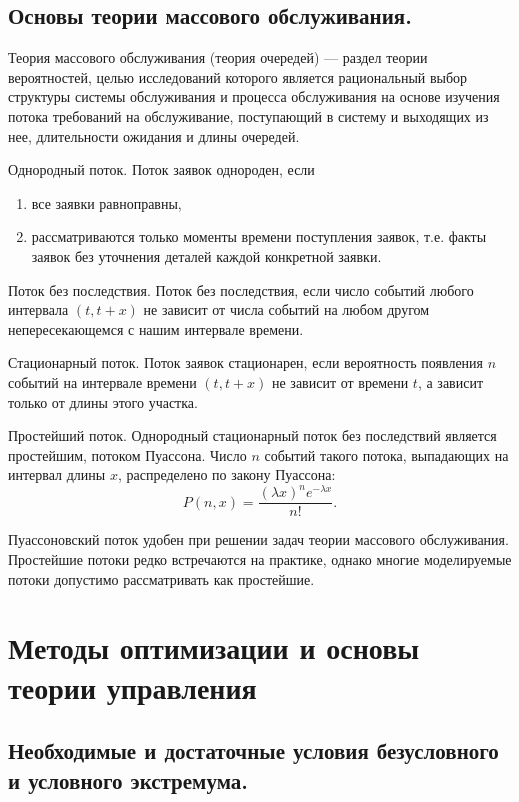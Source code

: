 \documentclass[12pt]{report}
\theoremstyle{definition}
\begin{document}

\section
{
  Основы теории массового обслуживания.
}

Теория массового обслуживания (теория очередей) --- раздел теории вероятностей,
целью исследований которого является рациональный выбор структуры системы обслуживания
и процесса обслуживания на основе изучения потока требований на обслуживание, поступающий
в систему и выходящих из нее, длительности ожидания и длины очередей.

Однородный поток. Поток заявок однороден, если
\begin{enumerate}
\item все заявки равноправны,
\item рассматриваются только моменты времени поступления заявок, т.е. факты
заявок без уточнения деталей каждой конкретной заявки.
\end{enumerate}


Поток без последствия. Поток без последствия, если число событий любого интервала
$(t, t + x)$ не зависит от числа событий на любом другом непересекающемся с нашим
интервале времени.


Стационарный поток. Поток заявок стационарен, если вероятность появления $n$
событий на интервале времени $(t, t + x)$ не зависит от времени $t$, а зависит
только от длины этого участка.


Простейший поток. Однородный стационарный поток без последствий является
простейшим, потоком Пуассона.
Число $n$ событий такого потока, выпадающих на интервал длины $x$, распределено
по закону Пуассона:
$$
P(n, x) = \dfrac{(\lambda x)^n e^{-\lambda x}}{n!}.
$$

Пуассоновский поток удобен при решении задач теории массового обслуживания.
Простейшие потоки редко встречаются на практике, однако многие моделируемые
потоки допустимо рассматривать как простейшие.


\chapter{Методы оптимизации и основы теории управления}

\section
{
  Необходимые и достаточные условия безусловного и условного экстремума.
}
\end{document}
